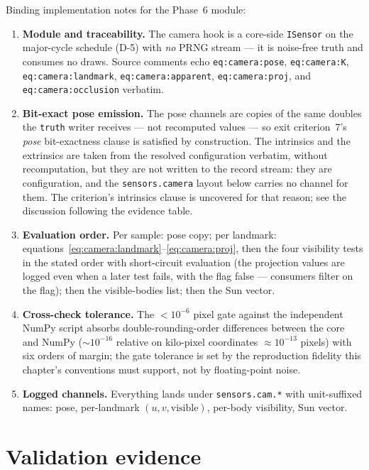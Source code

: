 Binding implementation notes for the Phase~6 module:
\begin{enumerate}
  \item \textbf{Module and traceability.} The camera hook is a
    core-side \texttt{ISensor} on the major-cycle schedule (D-5) with
    \emph{no} PRNG stream --- it is noise-free truth and consumes no
    draws. Source comments echo \texttt{eq:camera:pose},
    \texttt{eq:camera:K}, \texttt{eq:camera:landmark},
    \texttt{eq:camera:apparent}, \texttt{eq:camera:proj}, and
    \texttt{eq:camera:occlusion} verbatim.
  \item \textbf{Bit-exact pose emission.} The pose channels are copies
    of the same doubles the \texttt{truth} writer receives --- not
    recomputed values --- so exit criterion~7's \emph{pose} bit-exactness
    clause is satisfied by construction. The intrinsics and the extrinsics
    are taken from the resolved configuration verbatim, without
    recomputation, but they are not written to the record stream: they are
    configuration, and the \texttt{sensors.camera} layout below carries no
    channel for them. The criterion's intrinsics clause is uncovered for
    that reason; see the discussion following the evidence table.
  \item \textbf{Evaluation order.} Per sample: pose copy; per landmark:
    equations~\eqref{eq:camera:landmark}--\eqref{eq:camera:proj}, then
    the four visibility tests in the stated order with short-circuit
    evaluation (the projection values are logged even when a later
    test fails, with the flag false --- consumers filter on the flag);
    then the visible-bodies list; then the Sun vector.
  \item \textbf{Cross-check tolerance.} The $< 10^{-6}$ pixel gate
    against the independent NumPy script absorbs
    double-rounding-order differences between the core and NumPy
    ($\sim 10^{-16}$ relative on kilo-pixel coordinates
    $\approx 10^{-13}$ pixels) with six orders of margin; the gate
    tolerance is set by the reproduction fidelity this chapter's
    conventions must support, not by floating-point noise.
  \item \textbf{Logged channels.} Everything lands under
    \texttt{sensors.cam.*} with unit-suffixed names: pose, per-landmark
    $(u, v, \mathrm{visible})$, per-body visibility, Sun vector.
\end{enumerate}

\section{Validation evidence}
\label{sec:camera:validation}

